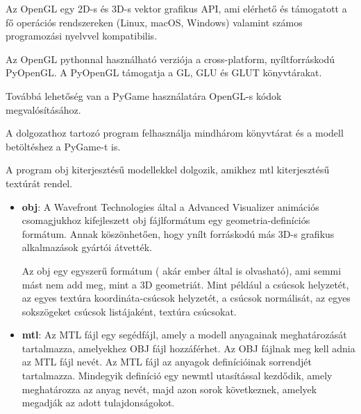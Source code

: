 




Az OpenGL egy 2D-s és 3D-s vektor grafikus  API, ami elérhető és támogatott a fő operációs rendszereken (Linux, macOS, Windows) valamint számos programozási nyelvvel kompatibilis. \cite{opengl}

Az OpenGL pythonnal használható verziója a cross-platform, nyíltforráskodú PyOpenGL. A PyOpenGL támogatja a GL, GLU és GLUT könyvtárakat. 

Továbbá lehetőség van a PyGame használatára OpenGL-s kódok megvalósításához.

A dolgozathoz tartozó program felhasználja mindhárom könyvtárat és a modell betöltéshez a PyGame-t is.

A program obj kiterjesztésű modellekkel dolgozik, amikhez mtl kiterjesztésű textúrát rendel. 
\begin{itemize}
\item {\bf obj}: A Wavefront Technologies által a Advanced Visualizer animációs csomagjukhoz kifejleszett obj fájlformátum egy geometria-definíciós formátum. 
Annak köszönhetően, hogy ynílt forráskodú más 3D-s grafikus alkalmazások gyártói átvették.

Az obj egy egyszerű formátum ( akár ember által is olvasható), ami semmi mást nem add meg, mint a 3D geometriát. Mint például a csúcsok helyzetét, az egyes textúra koordináta-csúcsok helyzetét, a csúcsok normálisát, az egyes sokszögeket csúcsok listájaként, textúra csúcsokat. \cite{obj}

\item {\bf mtl}: Az MTL fájl egy segédfájl, amely a modell anyagainak meghatározását tartalmazza, amelyekhez OBJ fájl hozzáférhet. Az OBJ fájlnak meg kell adnia az MTL fájl nevét. Az MTL fájl az anyagok definícióinak sorrendjét tartalmazza. Mindegyik definíció egy newmtl utasítással kezdődik, amely meghatározza az anyag nevét, majd azon sorok következnek, amelyek megadják az adott tulajdonságokot.\cite{mtl}
\end{itemize} 


